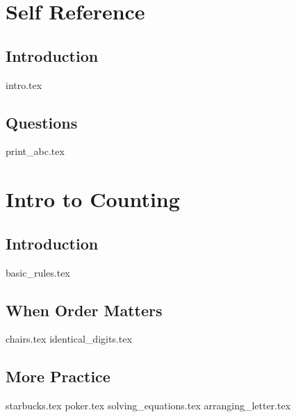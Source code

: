 \documentclass{exam}
\begin{document}
\section{Self Reference}
\subsection{Introduction}
{intro.tex}
\subsection{Questions}
\begin{questions}
{print_abc.tex}
\end{questions}



\section{Intro to Counting}
\subsection{Introduction}
{basic_rules.tex}
\subsection{When Order Matters}
\begin{questions}
{chairs.tex}
{identical_digits.tex}
\end{questions}
\subsection{More Practice}
\begin{questions}
{starbucks.tex}
{poker.tex}
{solving_equations.tex}
{arranging_letter.tex}
\end{questions}

\end{document}
